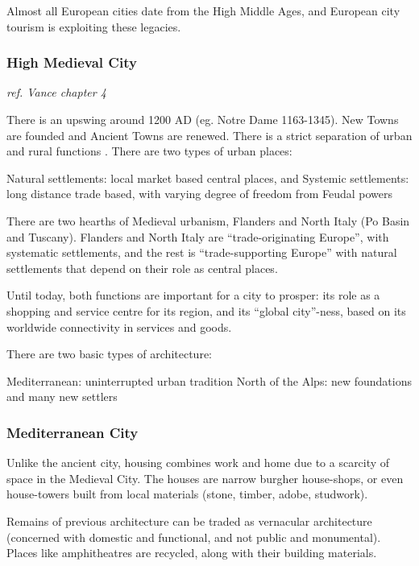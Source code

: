 \documentclass{article}
\newcommand{\alignedmarginpar}[1]{%
        \marginpar{\raggedright\small #1}
    }
\begin{document}
Almost all European cities date from the High Middle Ages, and European city tourism is exploiting these legacies.

\subsubsection{High Medieval City}

\textit{ref. Vance chapter 4}

There is an upswing around 1200 AD (eg. Notre Dame 1163-1345). New Towns are founded and Ancient Towns are renewed. There is a strict separation of urban and rural functions\alignedmarginpar{ref. Max Weber}. There are two types of urban places:

\begin{outline}
	\1 Natural settlements: local market based central places, and
	\1 Systemic settlements: long distance trade based, with varying degree of freedom from Feudal powers
\end{outline}

There are two hearths of Medieval urbanism, Flanders and North Italy (Po Basin and Tuscany). Flanders and North Italy are ``trade-originating Europe'', with systematic settlements, and the rest is ``trade-supporting Europe'' with natural settlements that depend on their role as central places.

Until today, both functions are important for a city to prosper: its role as a shopping and service centre for its region, and its ``global city''-ness, based on its worldwide connectivity in services and goods.

There are two basic types of architecture:

\begin{outline}
	\1 Mediterranean: uninterrupted urban tradition
	\1 North of the Alps: new foundations and many new settlers
\end{outline}

\subsubsection{Mediterranean City}

Unlike the ancient city, housing combines work and home due to a scarcity of space in the Medieval City. The houses are narrow burgher house-shops, or even house-towers built from local materials (stone, timber, adobe, studwork).

Remains of previous architecture can be traded as vernacular architecture (concerned with domestic and functional, and not public and monumental). Places like amphitheatres are recycled, along with their building materials.
\end{document}
